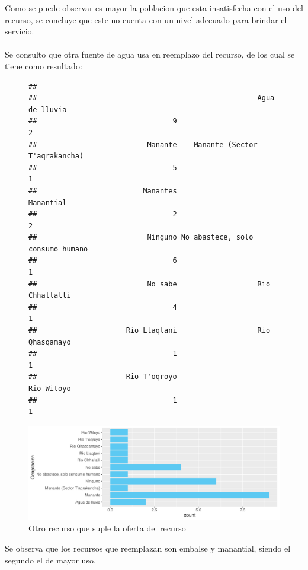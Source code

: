 \documentclass[12pt]{article}\usepackage[]{graphicx}\usepackage[]{xcolor}
\makeatletter
\def\maxwidth{ %
  \ifdim\Gin@nat@width>\linewidth
    \linewidth
  \else
    \Gin@nat@width
  \fi
}
\newenvironment{kframe}{%
 \def\at@end@of@kframe{}%
 \ifinner\ifhmode%
  \def\at@end@of@kframe{\end{minipage}}%
  \begin{minipage}{\columnwidth}%
 \fi\fi%
 \def\FrameCommand##1{\hskip\@totalleftmargin \hskip-\fboxsep
 \colorbox{shadecolor}{##1}\hskip-\fboxsep
     \hskip-\linewidth \hskip-\@totalleftmargin \hskip\columnwidth}%
 \MakeFramed {\advance\hsize-\width
   \@totalleftmargin\z@ \linewidth\hsize
   \@setminipage}}%
 {\par\unskip\endMakeFramed%
 \at@end@of@kframe}
\newenvironment{knitrout}{}{} %
\makeatother
\begin{document}
	Como se puede observar es mayor la poblacion que esta insatisfecha con el uso del recurso, se concluye que este no cuenta con un nivel adecuado para brindar el servicio.\\
	\\
	Se consulto que otra fuente de agua usa en reemplazo del recurso, de los cual se tiene como resultado:
	\begin{figure}[H]
	\centering
\begin{knitrout}
\color{fgcolor}\begin{kframe}
\begin{verbatim}
## 
##                                                    Agua de lluvia 
##                                9                                2 
##                          Manante    Manante (Sector T'aqrakancha) 
##                                5                                1 
##                         Manantes                        Manantial 
##                                2                                2 
##                          Ninguno No abastece, solo consumo humano 
##                                6                                1 
##                          No sabe                   Rio Chhallalli 
##                                4                                1 
##                     Rio Llaqtani                   Rio Qhasqamayo 
##                                1                                1 
##                     Rio T'oqroyo                       Rio Witoyo 
##                                1                                1
\end{verbatim}
\end{kframe}
\includegraphics[width=\maxwidth]{figure/diecisiete-1} 
\end{knitrout}
	\caption{Otro recurso que suple la oferta del recurso}
	\end{figure}
	Se observa que los recursos que reemplazan son embalse y manantial, siendo el segundo el de mayor uso.\\
\end{document}
